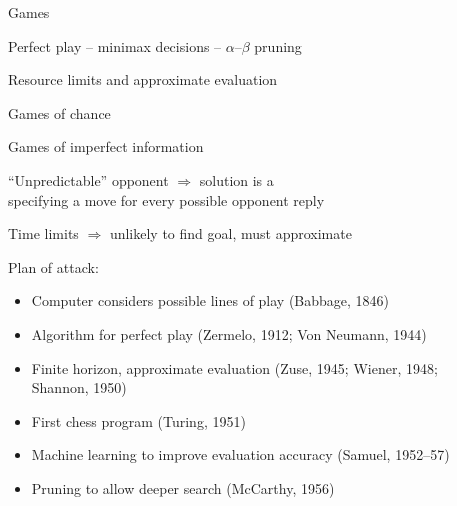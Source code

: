 \documentclass{article}
\begin{document}
\begin{huge}

\sf


\blob Games

\blob Perfect play\nl
-- minimax decisions\nl
-- $\alpha$--$\beta$ pruning

\blob Resource limits and approximate evaluation

\blob Games of chance

\blob Games of imperfect information



``Unpredictable'' opponent $\Rightarrow$ solution is a \\
specifying a move for every possible opponent reply

Time limits $\Rightarrow$ unlikely to find goal, must approximate

Plan of attack:
\begin{itemize}
\item Computer considers possible lines of play (Babbage, 1846)
\item Algorithm for perfect play (Zermelo, 1912; Von Neumann, 1944)
\item Finite horizon, approximate evaluation (Zuse, 1945; Wiener, 1948; \\
      Shannon, 1950)
\item First chess program (Turing, 1951)
\item Machine learning to improve evaluation accuracy (Samuel, 1952--57)
\item Pruning to allow deeper search (McCarthy, 1956)
\end{itemize}



\vspace*{0.3in}

\textwidth
{}






\textwidth
{}


\end{huge}
\end{document}
